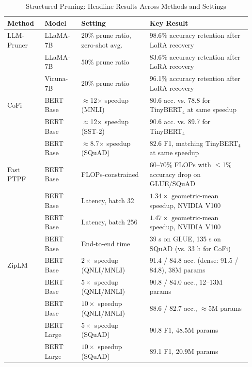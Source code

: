 \begin{table}[H]
	\centering
	\caption{Structured Pruning: Headline Results Across Methods and Settings}
	\label{tab:structured_summary}
	\begin{tabular}{@{}llp{4.5cm}p{4.5cm}@{}}
		\toprule
		\textbf{Method} & \textbf{Model} & \textbf{Setting} & \textbf{Key Result} \\
		\midrule
		LLM-Pruner \cite{ma2023llmpruner}
		  & LLaMA-7B & 20\% prune ratio, zero-shot avg. & 98.6\% accuracy retention after LoRA recovery \\
		  & LLaMA-7B & 50\% prune ratio & 83.6\% accuracy retention after LoRA recovery \\
		  & Vicuna-7B & 20\% prune ratio & 96.1\% accuracy retention after LoRA recovery \\
		\midrule
		CoFi \cite{xia2022structured}
		  & BERT Base & $\approx$12$\times$ speedup (MNLI) & 80.6 acc. vs. 78.8 for TinyBERT$_4$ at same speedup \\
		  & BERT Base & $\approx$12$\times$ speedup (SST-2) & 90.6 acc. vs. 89.7 for TinyBERT$_4$ \\
		  & BERT Base & $\approx$8.7$\times$ speedup (SQuAD) & 82.6 F1, matching TinyBERT$_4$ at same speedup \\
		\midrule
		Fast PTPF \cite{kwon2022fast}
		  & BERT Base & FLOPs-constrained & 60--70\% FLOPs with $\leq$1\% accuracy drop on GLUE/SQuAD \\
		  & BERT Base & Latency, batch 32 & $1.34\times$ geometric-mean speedup, NVIDIA V100 \\
		  & BERT Base & Latency, batch 256 & $1.47\times$ geometric-mean speedup, NVIDIA V100 \\
		  & BERT Base & End-to-end time & 39 s on GLUE, 135 s on SQuAD (vs. 33 h for CoFi) \\
		\midrule
		ZipLM \cite{kurtic2023ziplm}
		  & BERT Base & $2\times$ speedup (QNLI/MNLI) & 91.4 / 84.8 acc. (dense: 91.5 / 84.8), 38M params \\
		  & BERT Base & $5\times$ speedup (QNLI/MNLI) & 90.8 / 84.0 acc., 12--13M params \\
		  & BERT Base & $10\times$ speedup (QNLI/MNLI) & 88.6 / 82.7 acc., $\approx$5M params \\
		  & BERT Large & $5\times$ speedup (SQuAD) & 90.8 F1, 48.5M params \\
		  & BERT Large & $10\times$ speedup (SQuAD) & 89.1 F1, 20.9M params \\
		\bottomrule
	\end{tabular}
\end{table}

